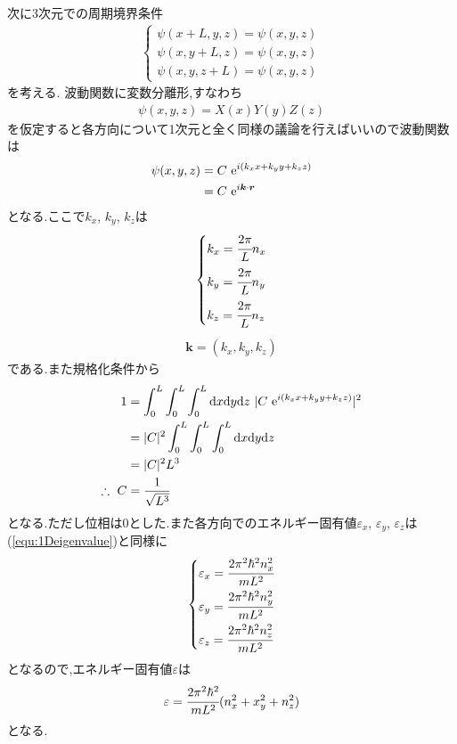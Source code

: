 次に3次元での周期境界条件
\begin{align}
  \begin{cases}
    \psi(x+L,y,z)=\psi(x,y,z)\\
    \psi(x,y+L,z)=\psi(x,y,z)\\
    \psi(x,y,z+L)=\psi(x,y,z)
  \end{cases}
\end{align}
を考える.
波動関数に変数分離形,すなわち
\begin{align}
  \psi(x,y,z)=X(x)Y(y)Z(z)
\end{align}
を仮定すると各方向について1次元と全く同様の議論を行えばいいので波動関数は
\begin{align}
  \psi(x,y,z)&=C\ {\rm e}^{i(k_xx+k_yy+k_zz)}\\
  &=C\ {\rm e}^{i{\bm k}\cdot\bm{r}}
\end{align}
となる.ここで$k_x$, $k_y$, $k_z$は
\begin{align}
  \begin{dcases}
    k_x=\cfrac{2\pi}{L}n_x\\
    k_y=\cfrac{2\pi}{L}n_y\\
    k_z=\cfrac{2\pi}{L}n_z\\
  \end{dcases}
\end{align}
\begin{align}
  \bm{k}=(k_x,k_y,k_z)
\end{align}
である.また規格化条件から
\begin{align*}
  1&=\int^L_0\int^L_0\int^L_0 {\rm d}x{\rm d}y{\rm d}z\ |C\ {\rm e}^{i(k_xx+k_yy+k_zz)}|^2\\
  &=|C|^2\int^L_0\int^L_0\int^L_0 {\rm d}x{\rm d}y{\rm d}z\\
  &=|C|^2L^3\\
  \therefore\  C&=\frac{1}{\sqrt{L^3}}
\end{align*}
となる.ただし位相は$0$とした.また各方向でのエネルギー固有値$\varepsilon_x$, $\varepsilon_y$, $\varepsilon_z$は(\ref{equ:1Deigenvalue})と同様に
\begin{align}
  \begin{dcases}
    \varepsilon_x=\cfrac{2\pi^2\hbar^2n_x^2}{mL^2}\\
    \varepsilon_y=\cfrac{2\pi^2\hbar^2n_y^2}{mL^2}\\
    \varepsilon_z=\cfrac{2\pi^2\hbar^2n_z^2}{mL^2}\\
  \end{dcases}
\end{align}
となるので,エネルギー固有値$\varepsilon$は
\begin{align}
  \varepsilon=\cfrac{2\pi^2\hbar^2}{mL^2}(n_x^2+x_y^2+n_z^2)
\end{align}
となる.